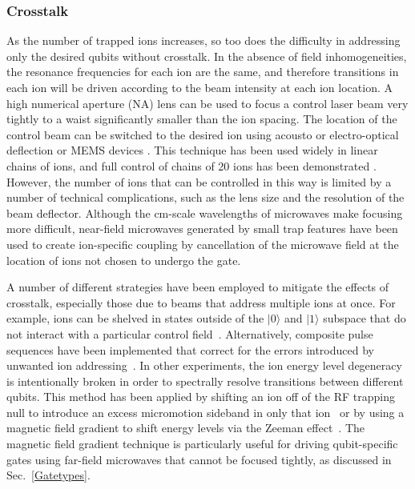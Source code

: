 \documentclass[%
reprint,
 amsmath,amssymb,
]{revtex4-1}
\begin{document}
    \subsubsection{Crosstalk}
As the number of trapped ions increases, so too does the difficulty in addressing only the desired qubits without crosstalk. In the absence of field inhomogeneities, the resonance frequencies for each ion are the same, and therefore transitions in each ion will be driven according to the beam intensity at each ion location. A high numerical aperture (NA) lens can be used to focus a control laser beam very tightly to a waist significantly smaller than the ion spacing. The location of the control beam can be switched to the desired ion using acousto or electro-optical deflection or MEMS devices \cite{KimMEMSMirror2007}. This technique has been used widely in linear chains of ions, and full control of chains of 20 ions has been demonstrated \cite{Friis20QubitEntanglement2018}. However, the number of ions that can be controlled in this way is limited by a number of technical complications, such as the lens size and the resolution of the beam deflector. Although the cm-scale wavelengths of microwaves make focusing more difficult, near-field microwaves generated by small trap features have been used to create ion-specific coupling \cite{PhysRevA.95.022337} by cancellation of the microwave field at the location of ions not chosen to undergo the gate.

A number of different strategies have been employed to mitigate the effects of crosstalk, especially those due to beams that address multiple ions at once. For example, ions can be shelved in states outside of the $|0\rangle$ and  $|1\rangle$  subspace that do not interact with a particular control field~\cite{RoosControl2004}.  Alternatively, composite pulse sequences have been implemented that correct for the errors introduced by unwanted ion addressing~\cite{herold2016universal}. In other experiments, the ion energy level degeneracy is intentionally broken in order to spectrally resolve transitions between different qubits. This method has been applied by shifting an ion off of the RF trapping null to introduce an excess micromotion sideband in only that ion~\cite{LeibfriedMicromotionAddress1999, AkermanUniversal2015} or by using a magnetic field gradient to shift energy levels via the Zeeman effect~\cite{MintertMicrowaveScheme2001, Timoney2011, PiltzLowCrosstalk2014}. The magnetic field gradient technique is particularly useful for driving qubit-specific gates using far-field microwaves that cannot be focused tightly, as discussed in Sec.~\ref{Gatetypes}.
\end{document}
